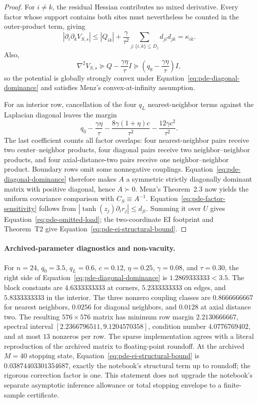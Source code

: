 \begin{proof}
For $i\ne k$, the residual Hessian contributes no mixed derivative.  Every
factor whose support contains both sites must nevertheless be counted in the
outer-product term, giving
\[
    |\partial_i\partial_k V_{S,s}|
    \le |Q_{ik}|+\frac{\gamma}{\tau^2}
    \sum_{j:\{i,k\}\subseteq D_j}d_{ji}d_{jk}
    =\kappa_{ik}.
\]
Also,
\[
    \nabla^2V_{S,s}\succeq Q-\frac{\gamma\eta}{\tau}I
    \succeq\left(q_0-\frac{\gamma\eta}{\tau}\right)I,
\]
so the potential is globally strongly convex under
Equation~\eqref{eq:pde-diagonal-dominance} and satisfies Menz's
convex-at-infinity assumption.

For an interior row, cancellation of the four $q_L$ nearest-neighbor terms
against the Laplacian diagonal leaves the margin
\[
    q_0-\frac{\gamma\eta}{\tau}
    -\frac{8\gamma(1+\eta)c}{\tau^2}
    -\frac{12\gamma c^2}{\tau^2}.
\]
The last coefficient counts all factor overlaps: four nearest-neighbor pairs
receive two center--neighbor products, four diagonal pairs receive two
neighbor--neighbor products, and four axial-distance-two pairs receive one
neighbor--neighbor product.  Boundary rows omit some nonnegative couplings.
Equation~\eqref{eq:pde-diagonal-dominance} therefore makes $A$ a symmetric
strictly diagonally dominant matrix with positive diagonal, hence $A\succ0$.
Menz's Theorem~2.3 now yields the uniform covariance comparison with
$C_S\equiv A^{-1}$.  Equation~\eqref{eq:pde-factor-sensitivity} follows from
$|\tanh(z_j)\partial_i r_j|\le d_{ji}$.  Summing it over $U$ gives
Equation~\eqref{eq:pde-omitted-load}; the two-coordinate EI footprint and
Theorem~T2 give Equation~\eqref{eq:pde-ei-structural-bound}.
\end{proof}

\paragraph{Archived-parameter diagnostics and non-vacuity.}
For $n=24$, $q_0=3.5$, $q_L=0.6$, $c=0.12$, $\eta=0.25$,
$\gamma=0.08$, and $\tau=0.30$, the right side of
Equation~\eqref{eq:pde-diagonal-dominance} is $1.2869333333<3.5$.  The
block constants are $4.6333333333$ at corners, $5.2333333333$ on edges, and
$5.8333333333$ in the interior.  The three nonzero coupling classes are
$0.8666666667$ for nearest neighbors, $0.0256$ for diagonal neighbors, and
$0.0128$ at axial distance two.  The resulting $576\times576$ matrix has
minimum row margin $2.2130666667$, spectral interval
$[2.2366796511,9.1204570358]$, condition number $4.0776769402$, and at most
$13$ nonzeros per row.  The sparse implementation agrees with a literal
reproduction of the archived matrix to floating-point roundoff.  At the
archived $M=40$ stopping state, Equation~\eqref{eq:pde-ei-structural-bound}
is $0.03874403301354687$, exactly the notebook's structural term up to
roundoff; the rigorous correction factor is one.  This statement does not
upgrade the notebook's separate asymptotic inference allowance or total
stopping envelope to a finite-sample certificate.

